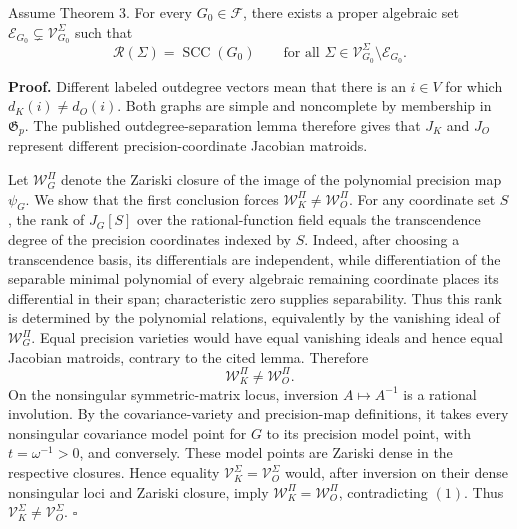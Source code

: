 Assume Theorem 3. For every \(G_0\in\mathcal F\), there exists a proper algebraic set \(\mathcal E_{G_0}\subsetneq\mathcal V_{G_0}^\Sigma\) such that
\[
 \mathcal R(\Sigma)=\operatorname{SCC}(G_0)
 \qquad\text{for all }\Sigma\in\mathcal V_{G_0}^\Sigma\setminus\mathcal E_{G_0}.
\]

\textbf{Proof.}
Different labeled outdegree vectors mean that there is an \(i\in V\) for which \(d_K(i)\ne d_O(i)\).  Both graphs are simple and noncomplete by membership in \(\mathfrak G_p\).  The published outdegree-separation lemma therefore gives that \(J_K\) and \(J_O\) represent different precision-coordinate Jacobian matroids.

Let \(\mathcal W_G^\Pi\) denote the Zariski closure of the image of the polynomial precision map \(\psi_G\).  We show that the first conclusion forces \(\mathcal W_K^\Pi\ne\mathcal W_O^\Pi\).  For any coordinate set \(S\), the rank of \(J_G[S]\) over the rational-function field equals the transcendence degree of the precision coordinates indexed by \(S\).  Indeed, after choosing a transcendence basis, its differentials are independent, while differentiation of the separable minimal polynomial of every algebraic remaining coordinate places its differential in their span; characteristic zero supplies separability.  Thus this rank is determined by the polynomial relations, equivalently by the vanishing ideal of \(\mathcal W_G^\Pi\).  Equal precision varieties would have equal vanishing ideals and hence equal Jacobian matroids, contrary to the cited lemma.  Therefore
\[
 \mathcal W_K^\Pi\ne\mathcal W_O^\Pi.
 \tag{1}
\]
On the nonsingular symmetric-matrix locus, inversion \(A\mapsto A^{-1}\) is a rational involution.  By the covariance-variety and precision-map definitions, it takes every nonsingular covariance model point for \(G\) to its precision model point, with \(t=\omega^{-1}>0\), and conversely.  These model points are Zariski dense in the respective closures.  Hence equality \(\mathcal V_K^\Sigma=\mathcal V_O^\Sigma\) would, after inversion on their dense nonsingular loci and Zariski closure, imply \(\mathcal W_K^\Pi=\mathcal W_O^\Pi\), contradicting \((1)\).  Thus \(\mathcal V_K^\Sigma\ne\mathcal V_O^\Sigma\). \(\square\)

